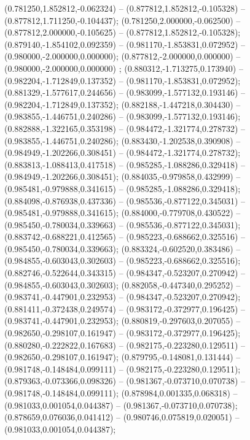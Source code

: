  (0.781250,1.852812,-0.062324) -- (0.877812,1.852812,-0.105328) -- (0.877812,1.711250,-0.104437);
 (0.781250,2.000000,-0.062500) -- (0.877812,2.000000,-0.105625) -- (0.877812,1.852812,-0.105328);
 (0.879140,-1.854102,0.092359) -- (0.981170,-1.853831,0.072952) -- (0.980000,-2.000000,0.000000);
 (0.877812,-2.000000,0.000000) -- (0.980000,-2.000000,0.000000) ;
 (0.880312,-1.713275,0.173940) -- (0.982204,-1.712849,0.137352) -- (0.981170,-1.853831,0.072952);
 (0.881329,-1.577617,0.244656) -- (0.983099,-1.577132,0.193146) -- (0.982204,-1.712849,0.137352);
 (0.882188,-1.447218,0.304430) -- (0.983855,-1.446751,0.240286) -- (0.983099,-1.577132,0.193146);
 (0.882888,-1.322165,0.353198) -- (0.984472,-1.321774,0.278732) -- (0.983855,-1.446751,0.240286);
 (0.883430,-1.202538,0.390908) -- (0.984949,-1.202266,0.308451) -- (0.984472,-1.321774,0.278732);
 (0.883813,-1.088413,0.417518) -- (0.985285,-1.088286,0.329418) -- (0.984949,-1.202266,0.308451);
 (0.884035,-0.979858,0.432999) -- (0.985481,-0.979888,0.341615) -- (0.985285,-1.088286,0.329418);
 (0.884098,-0.876938,0.437336) -- (0.985536,-0.877122,0.345031) -- (0.985481,-0.979888,0.341615);
 (0.884000,-0.779708,0.430522) -- (0.985450,-0.780034,0.339663) -- (0.985536,-0.877122,0.345031);
 (0.883742,-0.688221,0.412565) -- (0.985223,-0.688662,0.325516) -- (0.985450,-0.780034,0.339663);
 (0.883324,-0.602520,0.383486) -- (0.984855,-0.603043,0.302603) -- (0.985223,-0.688662,0.325516);
 (0.882746,-0.522644,0.343315) -- (0.984347,-0.523207,0.270942) -- (0.984855,-0.603043,0.302603);
 (0.882058,-0.447340,0.295252) -- (0.983741,-0.447901,0.232953) -- (0.984347,-0.523207,0.270942);
 (0.881411,-0.372438,0.249574) -- (0.983172,-0.372977,0.196425) -- (0.983741,-0.447901,0.232953);
 (0.880819,-0.297603,0.207055) -- (0.982650,-0.298107,0.161947) -- (0.983172,-0.372977,0.196425);
 (0.880280,-0.222822,0.167683) -- (0.982175,-0.223280,0.129511) -- (0.982650,-0.298107,0.161947);
 (0.879795,-0.148081,0.131444) -- (0.981748,-0.148484,0.099111) -- (0.982175,-0.223280,0.129511);
 (0.879363,-0.073366,0.098326) -- (0.981367,-0.073710,0.070738) -- (0.981748,-0.148484,0.099111);
 (0.878984,0.001335,0.068318) -- (0.981033,0.001054,0.044387) -- (0.981367,-0.073710,0.070738);
 (0.878659,0.076036,0.041412) -- (0.980746,0.075819,0.020051) -- (0.981033,0.001054,0.044387);
